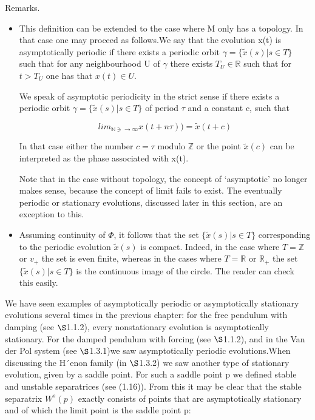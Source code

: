 \documentclass{article}
\begin{document}
\hfill

Remarks.

\begin{itemize}
\item This definition can be extended to the case where M only has a topology. In that
case one may proceed as follows.We say that the evolution x(t) is asymptotically
periodic if there exists a periodic orbit $\gamma = \{ \tilde{x}(s) | s \in T \}$ such that for any
neighbourhood U of $\gamma$ there exists $T_U \in \mathbb{R}$ such that for $t > T_U$ one has that
$x(t) \in U$.

\hfill

We speak of asymptotic periodicity in the strict sense if there exists a periodic
orbit $\gamma = \{ \tilde{x}(s) | s \in T \}$ of period $\tau$ and a constant c, such that

\[
lim_{\mathbb{N} \ni \to \infty} x(t + n \tau)) = \tilde{x}(t+c)
\]

In that case either the number $c = \tau$ modulo $\mathbb{Z}$ or the point $\tilde{x}(c)$ can be interpreted
as the phase associated with x(t).

\hfill

Note that in the case without topology, the concept of ‘asymptotic’ no longer
makes sense, because the concept of limit fails to exist. The eventually periodic
or stationary evolutions, discussed later in this section, are an exception to this.

\item Assuming continuity of $\Phi$, it follows that the set $\{ \tilde{x}(s) | s \in T \}$ corresponding
to the periodic evolution $\tilde{x}(s)$ is compact. Indeed, in the case where $T = \mathbb{Z}$ or $v_{+}$ the set is even finite, whereas in the cases where $T = \mathbb{R}$ or $\mathbb{R}_{+}$ the set $\{ \tilde{x}(s) | s \in T \}$ is the continuous image of the circle. The reader can check this
easily.

\end{itemize}

We have seen examples of asymptotically periodic or asymptotically stationary
evolutions several times in the previous chapter: for the free pendulum with damping
(see $\S$1.1.2), every nonstationary evolution is asymptotically stationary. For the
damped pendulum with forcing (see $\S$1.1.2), and in the Van der Pol system (see $\S$1.3.1)we saw asymptotically periodic evolutions.When discussing the H´enon family
(in $\S$1.3.2) we saw another type of stationary evolution, given by a saddle point.
For such a saddle point p we defined stable and unstable separatrices (see (1.16)).
From this it may be clear that the stable separatrix $W^s(p)$ exactly consists of points
that are asymptotically stationary and of which the limit point is the saddle point p:
\end{document}
